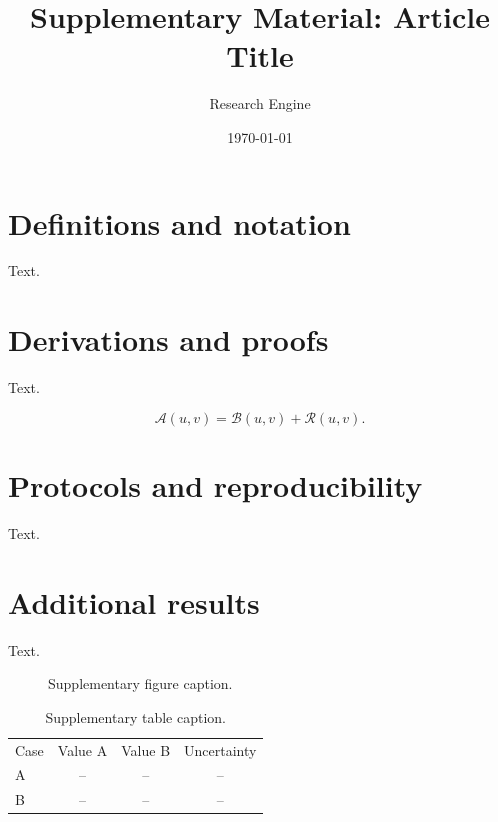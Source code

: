 \documentclass[aps,prl,onecolumn,10pt,superscriptaddress,nofootinbib,longbibliography]{revtex4-2}
\theoremstyle{definition}
\theoremstyle{remark}
\begin{document}
\title{Supplementary Material: Article Title}

\author{Research Engine}
\noaffiliation

\date{\today}

\maketitle

\section{Definitions and notation}

Text.

\section{Derivations and proofs}

Text.

\begin{equation}
  \mathcal{A}(u,v)=\mathcal{B}(u,v)+\mathcal{R}(u,v).
  \label{eq:s-example}
\end{equation}

\section{Protocols and reproducibility}

Text.

\section{Additional results}

Text.

\begin{figure}[t]
  \centering
  \fbox{\rule{0pt}{1.7in}\rule{0.86\textwidth}{0pt}}
  \caption{Supplementary figure caption.\label{fig:s-example}}
\end{figure}

\begin{table}[t]
  \caption{Supplementary table caption.\label{tab:s-example}}
  \begin{ruledtabular}
  \begin{tabular}{lccc}
  Case & Value A & Value B & Uncertainty \\
  \colrule
  A & -- & -- & -- \\
  B & -- & -- & -- \\
  \end{tabular}
  \end{ruledtabular}
\end{table}

\end{document}
